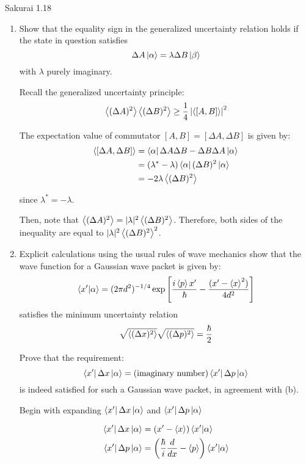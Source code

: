 \documentclass{article}
\begin{document}
\begin{section}{Sakurai 1.18}
\begin{enumerate}
		\item Show that the equality sign in the generalized uncertainty relation holds if the state in question satisfies
			$$
				\Delta A \ket{\alpha} = \lambda \Delta B \ket{\beta}
			$$
			with $\lambda$ purely imaginary.

			\begin{tcolorbox}[breakable]
				Recall the generalized uncertainty principle:
				$$
					\left<(\Delta A)^2\right> \left<(\Delta B)^2\right> \geq \frac{1}{4} \left|\left<[A,B]\right>\right|^2
				$$

				The expectation value of commutator $[A,B] = [\Delta A, \Delta B]$ is given by:
				\begin{align*}
					\left<[\Delta A, \Delta B]\right> & = \bra{\alpha}\Delta A \Delta B - \Delta B \Delta A \ket{\alpha} \\
					                            & = (\lambda^* - \lambda) \bra{\alpha} (\Delta B)^2 \ket{\alpha}   \\
					                            & = -2\lambda \left<(\Delta B)^2\right>
				\end{align*}

				since $\lambda^* = -\lambda$.

				Then, note that $\left<(\Delta A)^2\right> = |\lambda|^2 \left<(\Delta B)^2\right>$. Therefore, both sides of the inequality are equal to $|\lambda|^2 \left<(\Delta B)^2\right>^2$.
			\end{tcolorbox}

		\item Explicit calculations using the usual rules of wave mechanics show that the wave function for a Gaussian wave packet is given by:
			$$
				\braket{x'}{\alpha} = (2\pi d^2)^{-1/4} \exp\left[\frac{i \left<p\right>x'}{\hbar} - \frac{(x' - \left<x\right>^2)}{4d^2}\right]
			$$
			satisfies the minimum uncertainty relation
			$$
				\sqrt{\left<(\Delta x)^2\right>} \sqrt{\left<(\Delta p)^2\right>} = \frac{\hbar}{2}
			$$

			Prove that the requirement:
			$$
				\bra{x'}\Delta x\ket{\alpha} = (\text{imaginary number})\bra{x'}\Delta p\ket{\alpha}
			$$
			is indeed satisfied for such a Gaussian wave packet, in agreement with (b).

			\begin{tcolorbox}
				Begin with expanding $\bra{x'}\Delta x\ket{\alpha}$ and $\bra{x'}\Delta p\ket{\alpha}$

				\begin{align*}
					\bra{x'}\Delta x\ket{\alpha} & = (x' - \left<x\right>) \braket{x'}{\alpha}                                    \\
					\bra{x'}\Delta p\ket{\alpha} & = \left(\frac{\hbar}{i} \frac{d}{dx} - \left<p\right>\right) \braket{x'}{\alpha}
				\end{align*}


\end{tcolorbox}
\end{enumerate}
\end{section}
\end{document}
